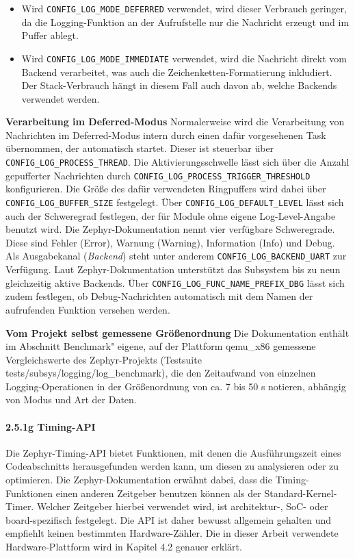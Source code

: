 \begin{itemize}
\item Wird \lstinline[style=fileinline]|CONFIG_LOG_MODE_DEFERRED| verwendet, wird dieser Verbrauch geringer, da die Logging-Funktion an der Aufrufstelle nur die Nachricht erzeugt und im Puffer ablegt.
\item Wird \lstinline[style=fileinline]|CONFIG_LOG_MODE_IMMEDIATE| verwendet, wird die Nachricht direkt vom Backend verarbeitet, was auch die Zeichenketten-Formatierung inkludiert. Der Stack-Verbrauch h{\"a}ngt in diesem Fall auch davon ab, welche Backends verwendet werden.
\end{itemize}
\textbf{Verarbeitung im Deferred-Modus} Normalerweise wird die Verarbeitung von Nachrichten im Deferred-Modus intern durch einen daf{\"u}r vorgesehenen Task {\"u}bernommen, der automatisch startet. Dieser ist steuerbar {\"u}ber \lstinline[style=fileinline]|CONFIG_LOG_PROCESS_THREAD|. Die Aktivierungsschwelle l{\"a}sst sich {\"u}ber die Anzahl gepufferter Nachrichten durch \lstinline[style=fileinline]|CONFIG_LOG_PROCESS_TRIGGER_THRESHOLD| konfigurieren. Die Gr{\"o}{\ss}e des daf{\"u}r verwendeten Ringpuffers wird dabei {\"u}ber \lstinline[style=fileinline]|CONFIG_LOG_BUFFER_SIZE| festgelegt. {\"U}ber \lstinline[style=fileinline]|CONFIG_LOG_DEFAULT_LEVEL| l{\"a}sst sich auch der Schweregrad festlegen, der f{\"u}r Module ohne eigene Log-Level-Angabe benutzt wird. Die Zephyr-Dokumentation nennt vier verf{\"u}gbare Schweregrade. Diese sind Fehler (Error), Warnung (Warning), Information (Info) und Debug. Als Ausgabekanal (\emph{Backend}) steht unter anderem \lstinline[style=fileinline]|CONFIG_LOG_BACKEND_UART| zur Verf{\"u}gung. Laut Zephyr-Dokumentation unterst{\"u}tzt das Subsystem bis zu neun gleichzeitig aktive Backends. {\"U}ber \lstinline[style=fileinline]|CONFIG_LOG_FUNC_NAME_PREFIX_DBG| l{\"a}sst sich zudem festlegen, ob Debug-Nachrichten automatisch mit dem Namen der aufrufenden Funktion versehen werden.

\textbf{Vom Projekt selbst gemessene Gr{\"o}{\ss}enordnung} Die Dokumentation enth{\"a}lt im Abschnitt \glqq{}Benchmark" eigene, auf der Plattform qemu\_x86 gemessene Vergleichswerte des Zephyr-Projekts (Testsuite tests/subsys/logging/log\_benchmark), die den Zeitaufwand von einzelnen Logging-Operationen in der Gr{\"o}{\ss}enordnung von ca. 7 bis 50 \textmu{}s notieren, abh{\"a}ngig von Modus und Art der Daten.

\paragraph*{\textbf{2.5.1g Timing-API}}
Die Zephyr-Timing-API bietet Funktionen, mit denen die Ausf{\"u}hrungszeit eines Codeabschnitts herausgefunden werden kann, um diesen zu analysieren oder zu optimieren. Die Zephyr-Dokumentation erw{\"a}hnt dabei, dass die Timing-Funktionen einen anderen Zeitgeber benutzen k{\"o}nnen als der Standard-Kernel-Timer. Welcher Zeitgeber hierbei verwendet wird, ist architektur-, SoC- oder board-spezifisch festgelegt. Die API ist daher bewusst allgemein gehalten und empfiehlt keinen bestimmten Hardware-Z{\"a}hler. Die in dieser Arbeit verwendete Hardware-Plattform wird in Kapitel 4.2 genauer erkl{\"a}rt.

